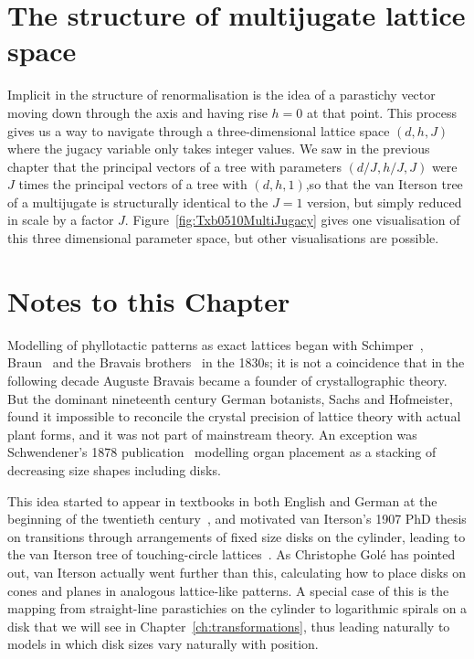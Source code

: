 \section{The structure of multijugate lattice space}
\label{sec:Jlattice}
Implicit in the structure of renormalisation is the idea of a parastichy vector moving down through the axis and having rise $h=0$ at that point. This process gives us a way to navigate through a three-dimensional lattice space $(d,h,J)$ where the jugacy variable only takes integer values. We saw in the previous chapter that the principal vectors of a tree with parameters $(d/J,h/J,J)$ were $J$ times the principal vectors of a tree with $(d,h,1)$,so that the van Iterson tree of a multijugate is structurally identical to the $J=1$ version, but simply reduced in scale by a factor $J$.  Figure~\ref{fig:Txb0510MultiJugacy} gives one visualisation of this three dimensional parameter space, but other visualisations are possible. 

\section{Notes to this Chapter}%

Modelling of phyllotactic patterns as exact lattices began with Schimper~\cite{schimperBeschreibungSymphytumZeyheri1835}, Braun~\cite{braunBetrachtungenUeberErscheinung1851} and the Bravais brothers~\cite{bravaisEssaiDispositionFeuilles1837} in the 1830s; it is not a coincidence that in the following decade Auguste Bravais became a founder of crystallographic theory. But the dominant nineteenth century German botanists, Sachs and Hofmeister, found it impossible to reconcile the crystal precision of lattice theory with actual plant forms, and it was not part of mainstream theory. An exception was Schwendener's 1878 publication~\cite{schwendenerMechanischeTheorieBlattstellungen1878} modelling organ placement as a stacking of decreasing size shapes including disks.

This idea started to appear in textbooks in both English and German at the beginning of the twentieth century~\cite{weisseSketchMechanicalHypothesis1900}, and motivated van Iterson's 1907 PhD thesis on transitions through arrangements of fixed size disks on the cylinder, leading to the van Iterson tree of touching-circle lattices~\cite{vanitersonjrMathematischeUndMikroscopischAnatomische1907}. 
As Christophe Golé has pointed out, van Iterson actually went further than this, calculating how to place disks on cones and planes in analogous lattice-like patterns. A special case of this is the mapping from straight-line parastichies on the cylinder to logarithmic spirals on a disk that we will see in Chapter~\ref{ch:transformations}, thus leading naturally to models in which disk sizes vary naturally with position. 


